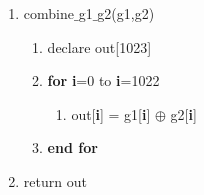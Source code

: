 \documentclass[journal,10pt,onecolumn]{article}
\begin{document}
\begin{enumerate}
\begin{enumerate}
    \item combine$\_$g1$\_$g2(g1,g2)
    \begin{enumerate}
        \item[] declare out[1023]
        \item[] \textbf{for} \textbf{i}=0 to \textbf{i}=1022
        \begin{enumerate}
            \item[] out[\textbf{i}] = g1[\textbf{i}] $\oplus$ g2[\textbf{i}]
        \end{enumerate}
        \item[]  \textbf{end for}
    \end{enumerate}
    \item[]  return out


\end{enumerate}
\end{enumerate}
\end{document}
